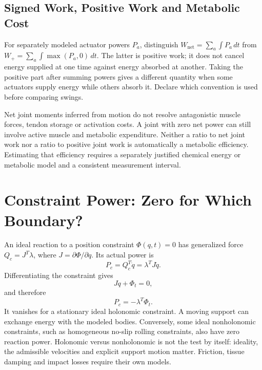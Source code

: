 \subsection{Signed Work, Positive Work and Metabolic Cost}

For separately modeled actuator powers $P_a$, distinguish
$W_{\mathrm{net}}=\sum_a\int P_a\,dt$ from
$W_+=\sum_a\int\max(P_a,0)\,dt$. The latter is positive work; it does not cancel
energy supplied at one time against energy absorbed at another. Taking the
positive part after summing powers gives a different quantity when some
actuators supply energy while others absorb it. Declare which convention is
used before comparing swings.

Net joint moments inferred from motion do not resolve antagonistic muscle
forces, tendon storage or activation costs. A joint with zero net power can
still involve active muscle and metabolic expenditure. Neither a ratio to net
joint work nor a ratio to positive joint work is automatically a metabolic
efficiency. Estimating that efficiency requires a separately justified chemical
energy or metabolic model and a consistent measurement interval.

\section{Constraint Power: Zero for Which Boundary?}
\label{sec:constraint_power_zero}

An ideal reaction to a position constraint $\Phi(q,t)=0$ has generalized force
$Q_c=J^T\lambda$, where $J=\partial\Phi/\partial q$. Its actual power is
\begin{equation}
P_c=Q_c^T\dot q=\lambda^T J\dot q.
\label{eq:constraint_power_general}
\end{equation}
Differentiating the constraint gives
\begin{equation}
J\dot q+\Phi_t=0,
\label{eq:constraint_time_derivative}
\end{equation}
and therefore
\begin{equation}
P_c=-\lambda^T\Phi_t.
\label{eq:constraint_power_zero}
\end{equation}
It vanishes for a stationary ideal holonomic constraint. A moving support can
exchange energy with the modeled bodies. Conversely, some ideal nonholonomic
constraints, such as homogeneous no-slip rolling constraints, also have zero
reaction power. Holonomic versus nonholonomic is not the test by itself:
ideality, the admissible velocities and explicit support motion matter.
Friction, tissue damping and impact losses require their own models.

